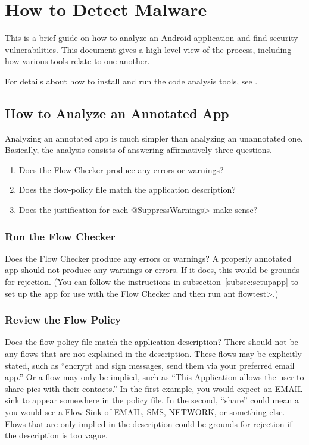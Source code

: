 \htmlhr
\chapter{How to Detect Malware\label{appanalysis}}

This is a brief guide on how to analyze an Android application and
find security vulnerabilities. This document gives a high-level view
of the process, including how various tools relate to one another.

For details about how to install and run the code analysis tools, see .

\section{How to Analyze an Annotated App\label{sec:analyzeannoapp}}
Analyzing an annotated app is much simpler than analyzing an unannotated one.  Basically, the analysis consists of answering affirmatively three questions.

\begin{enumerate}
\item Does the Flow Checker produce any errors or warnings?
\item Does the flow-policy file match the application description?
\item Does the justification for each \<@SuppressWarnings> make sense?
\end{enumerate}

\subsection{Run the Flow Checker}
Does the Flow Checker produce any errors or warnings? A properly annotated app should not produce
any warnings or errors.  If it does, this would be grounds for rejection.  (You can follow the instructions 
in subsection~\ref{subsec:setupapp} to set up the app for use with the Flow Checker and then run
\<ant flowtest>.)

\subsection{Review the Flow Policy}
Does the flow-policy file match the application description? There should not be any flows that are not 
explained in the description.  These flows may be explicitly stated, such as ``encrypt and sign messages, send them via your preferred email app.''   Or a flow may only be implied, such as ``This Application allows the user to share pics with their contacts.''  In the first example, you would expect an EMAIL sink to appear somewhere in the policy file. In the second, ``share'' could mean a you would see a Flow Sink of EMAIL, SMS, NETWORK, or something else.  Flows that are only implied in the description could be grounds for rejection if the description is too vague. 

